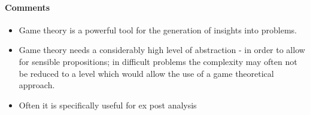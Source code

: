 \paragraph{Comments}

\begin{itemize}
    \item Game theory is a powerful tool for the generation of insights
        into problems.
    \item Game theory needs a considerably high level of abstraction -
        in order to allow for sensible propositions; in difficult problems
        the complexity may often not be reduced to a level which would
        allow the use of a game theoretical approach.
    \item Often it is specifically useful for ex post analysis
\end{itemize}

